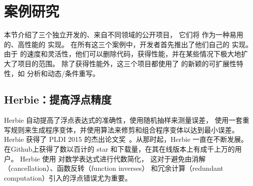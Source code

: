 \section{案例研究}
\label{sec:case-studies}

本节介绍了三个独立开发的、来自不同领域的公开项目，
  它们将 \egg 作为一种易用的、高性能的 \egraph 实现。
在所有这三个案例中，开发者首先推出了他们自己的 \egraph 实现。
由于 \egg 的速度和灵活性，他们可以删除代码，获得性能，并在某些情况下极大地扩大了项目的范围。
除了获得性能外，这三个项目都使用了 \egg 的新颖的可扩展性特性，如 \eclass 分析和动态/条件重写。


\subsection{Herbie：提高浮点精度}
\label{sec:herbie}


Herbie 自动提高了浮点表达式的准确性，使用随机抽样来测量误差，
  使用一套重写规则来生成程序变体，并使用算法来修剪和组合程序变体以达到最小误差。
Herbie 获得了 PLDI 2015 的杰出论文奖~\cite{herbie}。从那时起，Herbie 一直在不断发展。
  在Github上获得了数以百计的 star 和下载量，在其在线版本上有成千上万的用户。
Herbie 使用 \egraphs 对数学表达式进行代数简化，
  这对于避免由消解（cancellation）、函数反转（function inverses） %
  和冗余计算（redundant computation）引入的浮点错误尤为重要。 %


